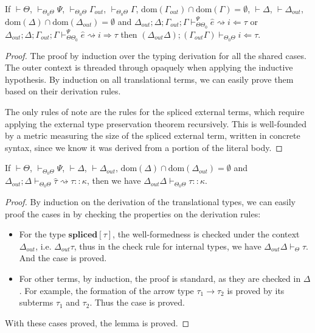 \documentclass{sig-alternate}
\begin{document}
\begin{lemma}
If $\vdash\Theta$, $\vdash_{\Theta_0\Theta} \Psi$, $\vdash_{\Theta_0\Theta}\Gamma_{out}$, $\vdash_{\Theta_0\Theta}\Gamma$, $\text{dom}(\Gamma_{out})\cap \text{dom}(\Gamma)=\emptyset$, $\vdash\Delta$, $\vdash\Delta_{out}$, $\text{dom}(\Delta)\cap\text{dom}(\Delta_{out})=\emptyset$ and $\Delta_{out};\Delta;\Gamma_{out};\Gamma\vdash_{\Theta\Theta_0}^{\Psi}\hat{e}\rightsquigarrow i\Leftarrow\tau$ or $\Delta_{out};\Delta;\Gamma_{out};\Gamma\vdash_{\Theta\Theta_0}^{\Psi}\hat{e}\rightsquigarrow i\Rightarrow \tau$ then $(\Delta_{out}\Delta);(\Gamma_{out}\Gamma)\vdash_{\Theta_0\Theta}i\Leftarrow \tau$.
\end{lemma}
\begin{proof}
The proof by induction over the typing derivation for all the shared cases. The outer context is threaded through opaquely when applying the inductive hypothesis. By induction on all translational terms, we can easily prove them based on their derivation rules.

The only rules of note are the rules for the spliced external terms, which require applying the external type preservation theorem recursively.
This is well-founded by a metric measuring the size of the spliced external term, written
in concrete syntax, since we know it was derived from a portion of the literal body.
\end{proof}

\begin{lemma}
If $\vdash\Theta$, $\vdash_{\Theta_0\Theta} \Psi$, $\vdash\Delta$, $\vdash\Delta_{out}$, $\text{dom}(\Delta)\cap\text{dom}(\Delta_{out})=\emptyset$ and $\Delta_{out};\Delta\vdash_{\Theta_0\Theta}\hat\tau\rightsquigarrow\tau::\kappa$, then we have $\Delta_{out}\Delta\vdash_{\Theta_0\Theta}\tau::\kappa$.
\end{lemma}
\begin{proof}
By induction on the derivation of the translational types, we can easily proof the cases in by checking the properties on the derivation rules:
\begin{itemize}
\item For the type $\mathbf{spliced}[\tau]$, the well-formedness is checked under the context $\Delta_{out}$, i.e. $\Delta_{out}\tau$, thus in the check rule for internal types, we have $\Delta_{out}\Delta\vdash_{\Theta}\tau$. And the case is proved.
\item For other terms, by induction, the proof is standard, as they are checked in $\Delta$. For example, the formation of the arrow type $\tau_1\rightarrow\tau_2$ is proved by its subterms $\tau_1$ and $\tau_2$. Thus the case is proved.
\end{itemize}
With these cases proved, the lemma is proved.
\end{proof}
\end{document}
